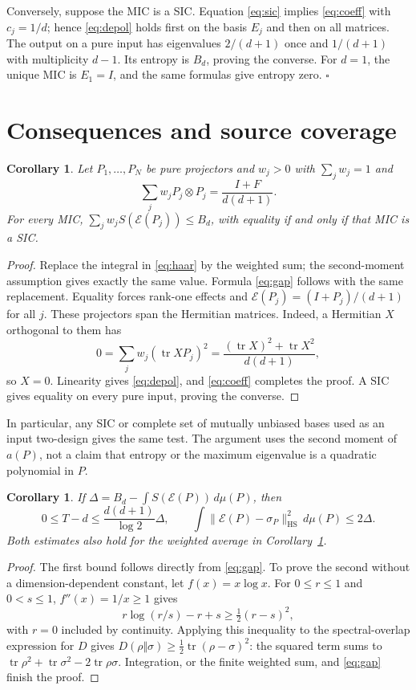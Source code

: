 \documentclass[11pt]{article}
\newtheorem{corollary}[theorem]{Corollary}
\newcommand{\tr}{\operatorname{tr}}
\newcommand{\Id}{I}
\newcommand{\cE}{\mathcal E}
\newcommand{\HS}{\mathrm{HS}}
\begin{document}
Conversely, suppose the MIC is a SIC. Equation \eqref{eq:sic} implies
\eqref{eq:coeff} with $c_j=1/d$; hence \eqref{eq:depol} holds first
on the basis $E_j$ and then on all matrices. The output on a pure input
has eigenvalues $2/(d+1)$ once and $1/(d+1)$ with multiplicity $d-1$.
Its entropy is $B_d$, proving the converse. For $d=1$, the unique MIC
is $E_1=\Id$, and the same formulas give entropy zero.
\hfill$\square$

\section{Consequences and source coverage}
\begin{corollary}\label{cor:design}
Let $P_1,\ldots,P_N$ be pure projectors and $w_j>0$ with
$\sum_jw_j=1$ and
\[
 \sum_jw_jP_j\otimes P_j=\frac{\Id+F}{d(d+1)}.
\]
For every MIC, $\sum_jw_jS(\cE(P_j))\leq B_d$, with equality if and
only if that MIC is a SIC.
\end{corollary}
\begin{proof}
Replace the integral in \eqref{eq:haar} by the weighted sum; the
second-moment assumption gives exactly the same value.
Formula \eqref{eq:gap} follows with the same replacement. Equality
forces rank-one effects and $\cE(P_j)=(\Id+P_j)/(d+1)$ for all $j$.
These projectors span the Hermitian matrices. Indeed, a Hermitian $X$
orthogonal to them has
\[
 0=\sum_jw_j(\tr XP_j)^2
   =\frac{(\tr X)^2+\tr X^2}{d(d+1)},
\]
so $X=0$. Linearity gives \eqref{eq:depol}, and
\eqref{eq:coeff} completes the proof. A SIC gives equality on every
pure input, proving the converse.
\end{proof}
In particular, any SIC or complete set of mutually unbiased bases used
as an input two-design gives the same test. The argument uses the
second moment of $a(P)$, not a claim that entropy or the maximum
eigenvalue is a quadratic polynomial in $P$.

\begin{corollary}\label{cor:quantitative}
If $\Delta=B_d-\int S(\cE(P))\,d\mu(P)$, then
\[
 0\leq T-d\leq\frac{d(d+1)}{\log2}\Delta,
 \qquad
 \int\|\cE(P)-\sigma_P\|_\HS^2\,d\mu(P)\leq2\Delta.
\]
Both estimates also hold for the weighted average in
Corollary~\ref{cor:design}.
\end{corollary}
\begin{proof}
The first bound follows directly from \eqref{eq:gap}. To prove the
second without a dimension-dependent constant, let $f(x)=x\log x$.
For $0\leq r\leq1$ and $0<s\leq1$, $f''(x)=1/x\geq1$ gives
\[
 r\log(r/s)-r+s\geq\tfrac12(r-s)^2,
\]
with $r=0$ included by continuity. Applying this inequality to the
spectral-overlap expression for $D$ gives
$D(\rho\Vert\sigma)\geq\frac12\tr(\rho-\sigma)^2$:
the squared term sums to
$\tr\rho^2+\tr\sigma^2-2\tr\rho\sigma$.
Integration, or the finite weighted sum, and \eqref{eq:gap} finish
the proof.
\end{proof}
\end{document}
